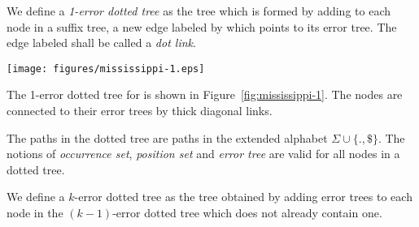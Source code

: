 \begin{definition}
We define a \emph{1-error dotted tree} as the tree which is formed by adding to each node in a suffix tree, a new edge labeled by \putstring{$\cdot$} which points to its error tree. The edge labeled \putstring{$\cdot$} shall be called a \emph{dot link}.
\end{definition}

\begin{figure*}
\centering
\texttt{[image: figures/mississippi-1.eps]}%
\caption{1-error dotted tree for }%
\label{fig:mississippi-1}%
\end{figure*}%
The 1-error dotted tree for  is shown in Figure~\ref{fig:mississippi-1}. The nodes are connected to their error trees by thick diagonal links.

The paths in the dotted tree are paths in the extended alphabet $\Sigma\cup\{.,\$\}$. The notions of \emph{occurrence set}, \emph{position set} and \emph{error tree} are valid for all nodes in a dotted tree.

\begin{definition}
We define a $k$-error dotted tree as the tree obtained by adding error trees to each node in the $(k-1)$-error dotted tree which does not already contain one.
\end{definition}

